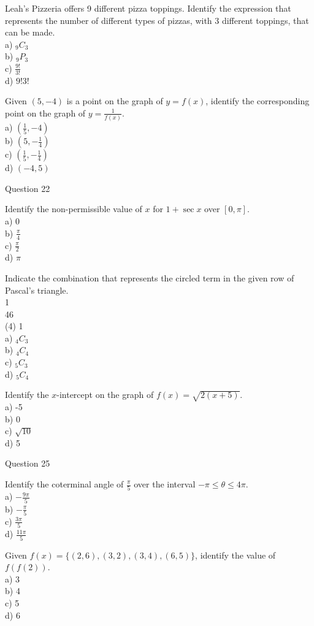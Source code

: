 \documentclass[10pt]{article}
\begin{document}
Leah's Pizzeria offers 9 different pizza toppings. Identify the expression that represents the number of different types of pizzas, with 3 different toppings, that can be made.\\
a) ${ }_{9} C_{3}$\\
b) ${ }_{9} P_{3}$\\
c) $\frac{9!}{3!}$\\
d) $9!3!$

Given $(5,-4)$ is a point on the graph of $y=f(x)$, identify the corresponding point on the graph of $y=\frac{1}{f(x)}$.\\
a) $\left(\frac{1}{5},-4\right)$\\
b) $\left(5,-\frac{1}{4}\right)$\\
c) $\left(\frac{1}{5},-\frac{1}{4}\right)$\\
d) $(-4,5)$

Question 22

Identify the non-permissible value of $x$ for $1+\sec x$ over $[0, \pi]$.\\
a) 0\\
b) $\frac{\pi}{4}$\\
c) $\frac{\pi}{2}$\\
d) $\pi$

Indicate the combination that represents the circled term in the given row of Pascal's triangle.\\
1\\
46\\
(4) 1\\
a) ${ }_{4} C_{3}$\\
b) ${ }_{4} C_{4}$\\
c) ${ }_{5} C_{3}$\\
d) ${ }_{5} C_{4}$

Identify the $x$-intercept on the graph of $f(x)=\sqrt{2(x+5)}$.\\
a) -5\\
b) 0\\
c) $\sqrt{10}$\\
d) 5

Question 25

Identify the coterminal angle of $\frac{\pi}{5}$ over the interval $-\pi \leq \theta \leq 4 \pi$.\\
a) $-\frac{9 \pi}{5}$\\
b) $-\frac{\pi}{5}$\\
c) $\frac{3 \pi}{5}$\\
d) $\frac{11 \pi}{5}$

Given $f(x)=\{(2,6),(3,2),(3,4),(6,5)\}$, identify the value of $f(f(2))$.\\
a) 3\\
b) 4\\
c) 5\\
d) 6
\end{document}
